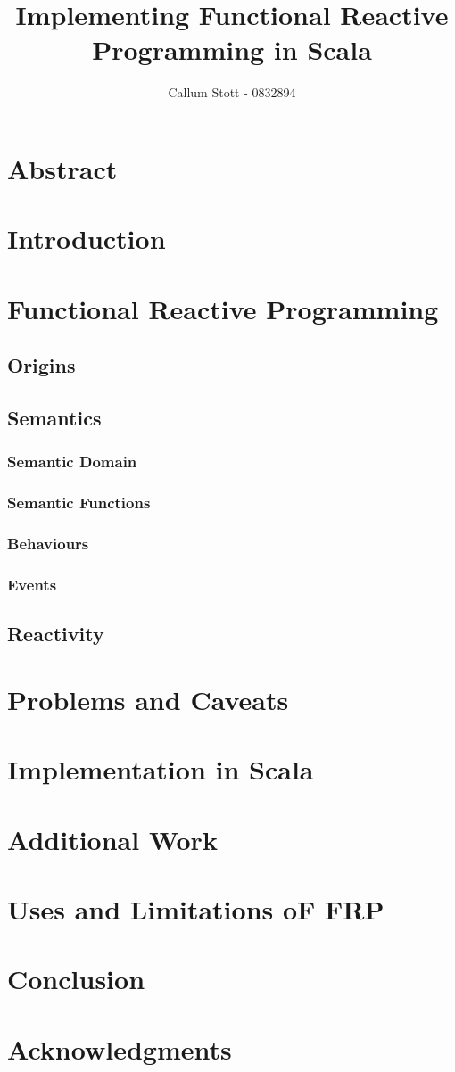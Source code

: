 \documentclass{article}
\title{Implementing Functional Reactive Programming in Scala}
\author{Callum Stott - 0832894}
\begin{document}
  \maketitle
  
  \newpage
  \tableofcontents
  
  \newpage
  \twocolumn
  
  \section*{Abstract}
  \section{Introduction}
  \section{Functional Reactive Programming}
    \subsection{Origins}
    \subsection{Semantics}
      \subsubsection{Semantic Domain}
      \subsubsection{Semantic Functions}
      \subsubsection{Behaviours}
      \subsubsection{Events}
    \subsection{Reactivity}
  \section{Problems and Caveats}
  \section{Implementation in Scala}
  \section{Additional Work}
  \section{Uses and Limitations oF FRP}
  \section{Conclusion}
  \section{Acknowledgments}
\end{document}
